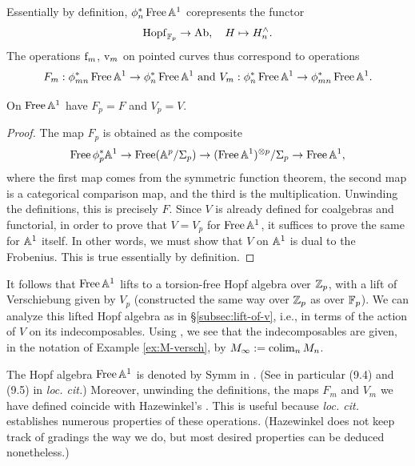 \begin{remark}
Essentially by definition, $\phi_n^* \operatorname{Free}\mathbb A^1$ corepresents the functor \[ \mathrm{Hopf}_{\mathbb{F}_p} \to \mathrm{Ab}, \quad H \mapsto H^\wedge_n. \]
The operations $\mathrm f_m$, $\mathrm v_m$ on pointed curves thus correspond to operations \[ F_m: \phi_{mn}^* \operatorname{Free}\mathbb A^1 \to \phi_n^*\operatorname{Free}\mathbb A^1 \text{ and } V_m: \phi_n^*\operatorname{Free}\mathbb A^1 \to \phi_{mn}^* \operatorname{Free}\mathbb A^1. \]
\end{remark}

\begin{lemma} \label{lemm:FV-on-W}
On $\operatorname{Free}\mathbb A^1$ have $F_p = F$ and $V_p = V$.
\end{lemma}
\begin{proof}
The map $F_p$ is obtained as the composite \[ \operatorname{Free} \phi_p^* \mathbb A^1 \to \operatorname{Free}(\mathbb A^p/\Sigma_p) \to (\operatorname{Free} \mathbb A^1)^{\otimes p}/\Sigma_p \to \operatorname{Free} \mathbb A^1, \] where the first map comes from the symmetric function theorem, the second map is a categorical comparison map, and the third is the multiplication.
Unwinding the definitions, this is precisely $F$.
Since $V$ is already defined for coalgebras and functorial, in order to prove that $V=V_p$ for $\operatorname{Free}\mathbb A^1$, it suffices to prove the same for $\mathbb A^1$ itself.
In other words, we must show that $V$ on $\mathbb A^1$ is dual to the Frobenius.
This is true essentially by definition.
\end{proof}

\begin{example} \label{ex:lift-FreeA1}
It follows that $\operatorname{Free}\mathbb A^1$ lifts to a torsion-free Hopf algebra over $\mathbb{Z}_p$, with a lift of Verschiebung given by $V_p$ (constructed the same way over $\mathbb{Z}_p$ as over $\mathbb{F}_p$).
We can analyze this lifted Hopf algebra as in \S\ref{subsec:lift-of-v}, i.e., in terms of the action of $V$ on its indecomposables.
Using \cite[(13.4)]{hazewinkel-witt-vectors}, we see that the indecomposables are given, in the notation of Example \ref{ex:M-versch}, by $M_\infty := \operatorname*{colim}_n M_n$.
\end{example}

\begin{remark} \label{rmk:symm-hazewinkel}
The Hopf algebra $\operatorname{Free}\mathbb A^1$ is denoted by $\mathrm{Symm}$ in \cite{hazewinkel-witt-vectors}.
(See in particular (9.4) and (9.5) in \emph{loc. cit.})
Moreover, unwinding the definitions, the maps $F_m$ and $V_m$ we have defined coincide with Hazewinkel's \cite[\S13]{hazewinkel-witt-vectors}.
This is useful because \emph{loc. cit.} establishes numerous properties of these operations.
(Hazewinkel does not keep track of gradings the way we do, but most desired properties can be deduced nonetheless.)
\end{remark}

